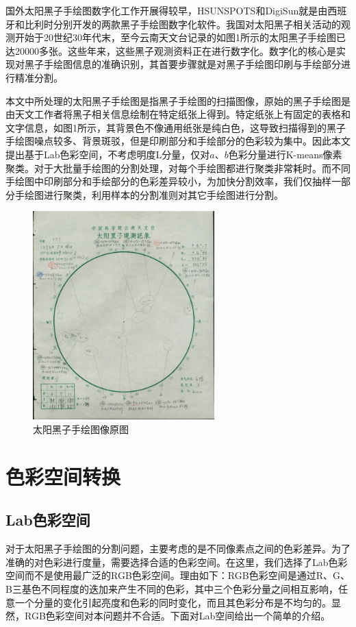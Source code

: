\documentclass[UTF8,a4paper,twoside]{ctexart}
\begin{document}
国外太阳黑子手绘图数字化工作开展得较早，HSUNSPOTS和DigiSun就是由西班牙和比利时分别开发的两款黑子手绘图数字化软件。我国对太阳黑子相关活动的观测开始于20世纪30年代末，至今云南天文台记录的如图1所示的太阳黑子手绘图已达20000多张。这些年来，这些黑子观测资料正在进行数字化。数字化的核心是实现对黑子手绘图信息的准确识别，其首要步骤就是对黑子手绘图印刷与手绘部分进行精准分割。

本文中所处理的太阳黑子手绘图是指黑子手绘图的扫描图像，原始的黑子手绘图是由天文工作者将黑子相关信息绘制在特定纸张上得到。特定纸张上有固定的表格和文字信息，如图1所示，其背景色不像通用纸张是纯白色，这导致扫描得到的黑子手绘图噪点较多、背景斑驳，但是印刷部分和手绘部分的色彩较为集中。因此本文提出基于Lab色彩空间，不考虑明度L分量，仅对$a$、$b$色彩分量进行K-means像素聚类。对于大批量手绘图的分割处理，对每个手绘图都进行聚类非常耗时。而不同手绘图中印刷部分和手绘部分的色彩差异较小，为加快分割效率，我们仅抽样一部分手绘图进行聚类，利用样本的分割准则对其它手绘图进行分割。

\begin{figure}
  \centering
  \includegraphics[width=7cm]{fig01.png}
  \caption{太阳黑子手绘图像原图}
\end{figure}

\section{色彩空间转换}
\subsection{Lab色彩空间}
对于太阳黑子手绘图的分割问题，主要考虑的是不同像素点之间的色彩差异。为了准确的对色彩进行度量，需要选择合适的色彩空间。在这里，我们选择了Lab色彩空间而不是使用最广泛的RGB色彩空间。理由如下：RGB色彩空间是通过R、G、B三基色不同程度的迭加来产生不同的色彩，其中三个色彩分量之间相互影响，任意一个分量的变化引起亮度和色彩的同时变化，而且其色彩分布是不均匀的。显然，RGB色彩空间对本问题并不合适。下面对Lab空间给出一个简单的介绍。
\end{document}
